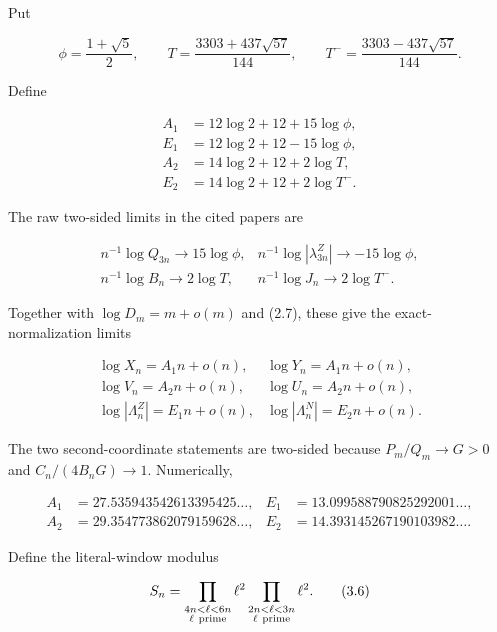 \documentclass[
  11pt,
]{article}
\begin{document}
Put

\[
 \phi=\frac{1+\sqrt5}{2},\qquad
 T=\frac{3303+437\sqrt{57}}{144},\qquad
 T^-=\frac{3303-437\sqrt{57}}{144}.                  \tag{3.1}
\]

Define

\[
\begin{aligned}
 A_1&=12\log2+12+15\log\phi,\\
 E_1&=12\log2+12-15\log\phi,\\
 A_2&=14\log2+12+2\log T,\\
 E_2&=14\log2+12+2\log T^-.
\end{aligned}                                        \tag{3.2}
\]

The raw two-sided limits in the cited papers are

\[
\begin{array}{ll}
 n^{-1}\log Q_{3n}\to15\log\phi,&
 n^{-1}\log|\lambda_{3n}^Z|\to-15\log\phi,\\
 n^{-1}\log B_n\to2\log T,&
 n^{-1}\log J_n\to2\log T^-.
\end{array}                                          \tag{3.3}
\]

Together with \(\log D_m=m+o(m)\) and (2.7), these give the
exact-normalization limits

\[
\begin{array}{ll}
 \log X_n=A_1n+o(n),&\log Y_n=A_1n+o(n),\\
 \log V_n=A_2n+o(n),&\log U_n=A_2n+o(n),\\
 \log|\Lambda_n^Z|=E_1n+o(n),&
 \log|\Lambda_n^N|=E_2n+o(n).
\end{array}                                          \tag{3.4}
\]

The two second-coordinate statements are two-sided because
\(P_m/Q_m\to G>0\) and \(C_n/(4B_nG)\to1\). Numerically,

\[
\begin{aligned}
 A_1&=27.535943542613395425\ldots,&
 E_1&=13.099588790825292001\ldots,\\
 A_2&=29.354773862079159628\ldots,&
 E_2&=14.393145267190103982\ldots.
\end{aligned}                                        \tag{3.5}
\]

Define the literal-window modulus

\[
 S_n=
 \prod_{\substack{4n<\ell<6n\\\ell\ {\rm prime}}}\ell^2
 \prod_{\substack{2n<\ell<3n\\\ell\ {\rm prime}}}\ell^2.        \tag{3.6}
\]
\end{document}
